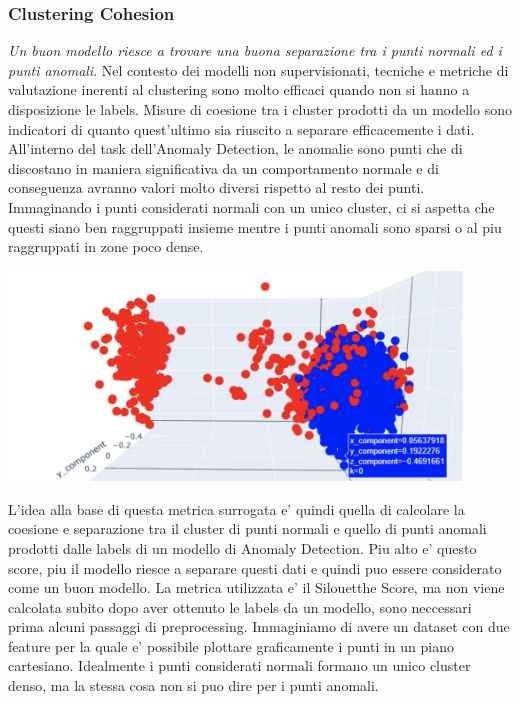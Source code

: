\subsubsection{Clustering Cohesion}
\textit{Un buon modello riesce a trovare una buona separazione tra i punti normali ed i punti anomali}.
Nel contesto dei modelli non supervisionati, tecniche e metriche di valutazione inerenti al clustering sono molto efficaci quando non si hanno a disposizione le labels. Misure di coesione tra i cluster prodotti da un modello sono indicatori di quanto quest'ultimo sia riuscito a separare efficacemente i dati.
All'interno del task dell'Anomaly Detection, le anomalie sono punti che di discostano in maniera significativa da un comportamento normale e di conseguenza avranno valori molto diversi rispetto al resto dei punti. Immaginando i punti considerati normali con un unico cluster, ci si aspetta che questi siano ben raggruppati insieme mentre i punti anomali sono sparsi o al piu raggruppati in zone poco dense.
\begin{center}
	\includegraphics[width=12cm, scale=1]{images/plot-anomalies-normal}
    \captionsetup{type=figure}
\end{center}
L'idea alla base di questa metrica surrogata e' quindi quella di calcolare la coesione e separazione tra il cluster di punti normali e quello di punti anomali prodotti dalle labels di un modello di Anomaly Detection. Piu alto e' questo score, piu il modello riesce a separare questi dati e quindi puo essere considerato come un buon modello.
La metrica utilizzata e' il Silouetthe Score, ma non viene calcolata subito dopo aver ottenuto le labels da un modello, sono neccessari prima alcuni passaggi di preprocessing.
Immaginiamo di avere un dataset con due feature per la quale e' possibile plottare graficamente i punti in un piano cartesiano. Idealmente i punti considerati normali formano un unico cluster denso, ma la stessa cosa non si puo dire per i punti anomali.



